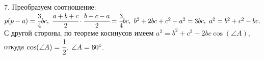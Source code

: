 7. Преобразуем соотношение: $p(p-a)=\cfrac{3}{4}bc,\ \cfrac{a+b+c}{2}\cdot\cfrac{b+c-a}{2}=\cfrac{3}{4}bc,\ b^2+2bc+c^2-a^2=3bc,\ a^2=b^2+c^2-bc.$ С другой стороны, по теореме косинусов имеем $a^2=b^2+c^2-2bc\cos(\angle A),$ откуда $\cos(\angle A)=\cfrac{1}{2},\ \angle A=60^\circ.$\\
